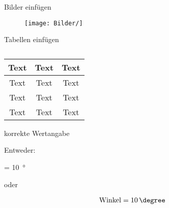 
Bilder einfügen

\begin{figure}[h]
\centering
\texttt{[image: Bilder/]}
\caption{} %
\label{}
\end{figure}



Tabellen einfügen

\begin{table}[!htb]
    \centering
    \caption{} %
    \label{}
    \begin{tabular}{c|c|c}
Text & Text & Text\\
\hline
Text & Text & Text\\
Text & Text & Text\\
Text & Text & Text\\
    \end{tabular}
\end{table}


korrekte Wertangabe

Entweder:

 = \SI{10}{\degree}

oder

\begin{align}
\mathrm{Winkel} = 10\,\mathrm{\degree}
\end{align}




